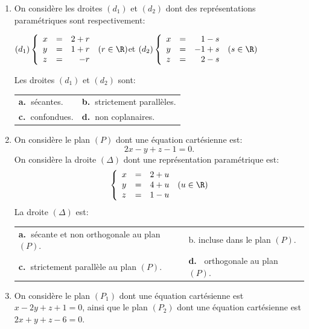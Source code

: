\begin{enumerate}[resume]
\item On considère les droites $\left(d_1\right)$ et $\left(d_2\right)$ dont des représentations paramétriques sont respectivement:
\begin{center}
$\left(d_1\right)\left\{\begin{array}{l c r}
x&=&2+r\\
y&=&1 + r\\
z&=&- r
\end{array}\right. \:(r \in \R)$\quad et 
$\left(d_2\right)\left\{\begin{array}{l c l}
x&=&\phantom{-}1 - s\\
y&=&-1 + s\\
z&=&\phantom{-}2 - s
\end{array}\right. \:(s \in \R)$\end{center}

Les droites $\left(d_1\right)$ et $\left(d_2\right)$  sont: 
\begin{center}
\begin{tabularx}{\linewidth}{X X}
\textbf{a.~}sécantes.&\textbf{b.~}strictement parallèles.\\
\textbf{c.~}confondues.&\textbf{d.~}non coplanaires.
\end{tabularx}
\end{center}
\item 
On considère le plan $(P)$ dont une équation cartésienne est: 
\[2x - y + z - 1 = 0.\]
On considère la droite $(\Delta)$ dont une représentation paramétrique est:
\[\left\{\begin{array}{l c r}
x&=&2 + u\\
y&=&4 + u\\
z&=&1 - u
\end{array}\right. \:(u \in \R)\]
La droite $(\Delta)$  est:

\begin{center}
\begin{tabularx}{\linewidth}{X X}
\textbf{a.~}sécante et non orthogonale\newline \hspace*{0.3cm} au plan $(P)$.&b. incluse dans le plan $(P)$.\\
\textbf{c.~}strictement parallèle au plan $(P)$.&\textbf{d.~} orthogonale au plan $(P)$.
\end{tabularx}
\end{center}

\item On considère le plan $\left(P_1\right)$ dont une équation cartésienne est $x - 2y + z + 1 = 0$, ainsi que le plan $\left(P_2\right)$ dont une équation cartésienne est $2x + y + z - 6 = 0$.


\end{enumerate}
